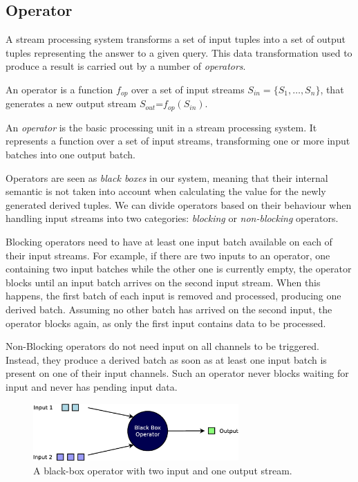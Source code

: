 \subsection*{Operator}
A stream processing system transforms a set of input tuples into a set of output tuples representing the
answer to a given query. This data transformation used to produce a result is carried out by a number
of \emph{operators}.


\begin{definition}[Operator]{
An operator is a function $f_{op}$ over a set of input streams $S_{in}=\{S_1,\dots,S_n\}$,
that generates a new output stream $S_{out}$=$f_{op}(S_{in})$. 
}
\end{definition}
 
An \textit{operator} is the basic processing unit in a stream processing system. It represents a
function over a set of input streams, transforming  one or more input batches into one output batch. 

Operators are seen as \textit{black boxes} in our system, meaning that their internal semantic is not
taken into account when calculating the \qm value for the newly generated derived tuples.
We can divide operators based on their behaviour when handling input streams into two categories:
\textit{blocking} or \textit{non-blocking} operators.

Blocking operators need to have at least one input batch available on each of their input
streams. For example, if there are two inputs to an operator, one containing two input
batches while the other one is currently empty, the operator blocks until an input batch arrives
on the second input stream. When this happens, the first batch of each input is removed and processed,
producing one derived batch. Assuming no other batch has arrived on the second input, the operator
blocks again, as only the first input contains data to be processed.

Non-Blocking operators do not need input on all channels to be triggered. Instead, they produce
a derived batch as soon as at least one input batch is present on one of their input channels. 
Such an operator never blocks waiting for input and never has pending input data.

\begin{figure}[b!]
	\centering
	\includegraphics[width=0.7\textwidth]{img/tesi/operator} 
	\caption{A black-box operator with two input and one output stream.}
	\label{fig:tuple}
\end{figure}

